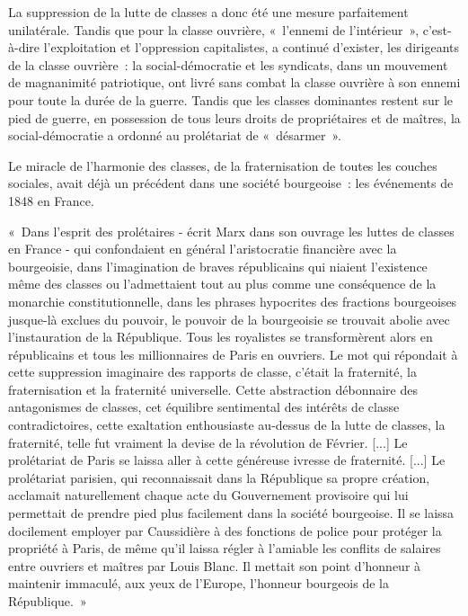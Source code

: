 \documentclass[french,twoside]{book} %
\newenvironment{quoteblock}%
  {\begin{quoting}}
  {\end{quoting}}
\newenvironment{quotebar}{%
    \def\FrameCommand{{\color{rubric!10!}\vrule width 0.5em} \hspace{0.9em}}%
    \def\OuterFrameSep{\itemsep} %
    \MakeFramed {\advance\hsize-\width \FrameRestore}
  }%
  {%
    \endMakeFramed
  }
\renewenvironment{quoteblock}%
  {%
    \savenotes
    \setstretch{0.9}
    \normalfont
    \begin{quotebar}
  }
  {%
    \end{quotebar}
    \spewnotes
  }
\begin{document}
La suppression de la lutte de classes a donc été une mesure parfaitement unilatérale. Tandis que pour la classe ouvrière, « l’ennemi de l’intérieur », c’est-à-dire l’exploitation et l’oppression capitalistes, a continué d’exister, les dirigeants de la classe ouvrière : la social-démocratie et les syndicats, dans un mouvement de magnanimité patriotique, ont livré sans combat la classe ouvrière à son ennemi pour toute la durée de la guerre. Tandis que les classes dominantes restent sur le pied de guerre, en possession de tous leurs droits de propriétaires et de maîtres, la social-démocratie a ordonné au prolétariat de « désarmer ».\par
Le miracle de l’harmonie des classes, de la fraternisation de toutes les couches sociales, avait déjà un précédent dans une société bourgeoise : les événements de 1848 en France.\par

\begin{quoteblock}
 \noindent « Dans l’esprit des prolétaires - écrit Marx dans son ouvrage les luttes de classes en France - qui confondaient en général l’aristocratie financière avec la bourgeoisie, dans l’imagination de braves républicains qui niaient l’existence même des classes ou l’admettaient tout au plus comme une conséquence de la monarchie constitutionnelle, dans les phrases hypocrites des fractions bourgeoises jusque-là exclues du pouvoir, le pouvoir de la bourgeoisie se trouvait abolie avec l’instauration de la République. Tous les royalistes se transformèrent alors en républicains et tous les millionnaires de Paris en ouvriers. Le mot qui répondait à cette suppression imaginaire des rapports de classe, c’était la fraternité, la fraternisation et la fraternité universelle. Cette abstraction débonnaire des antagonismes de classes, cet équilibre sentimental des intérêts de classe contradictoires, cette exaltation enthousiaste au-dessus de la lutte de classes, la fraternité, telle fut vraiment la devise de la révolution de Février. [...] Le prolétariat de Paris se laissa aller à cette généreuse ivresse de fraternité. [...] Le prolétariat parisien, qui reconnaissait dans la République sa propre création, acclamait naturellement chaque acte du Gouvernement provisoire qui lui permettait de prendre pied plus facilement dans la société bourgeoise. Il se laissa docilement employer par Caussidière à des fonctions de police pour protéger la propriété à Paris, de même qu’il laissa régler à l’amiable les conflits de salaires entre ouvriers et maîtres par Louis Blanc. Il mettait son point d’honneur à maintenir immaculé, aux yeux de l’Europe, l’honneur bourgeois de la République. »
\end{quoteblock}
\end{document}
